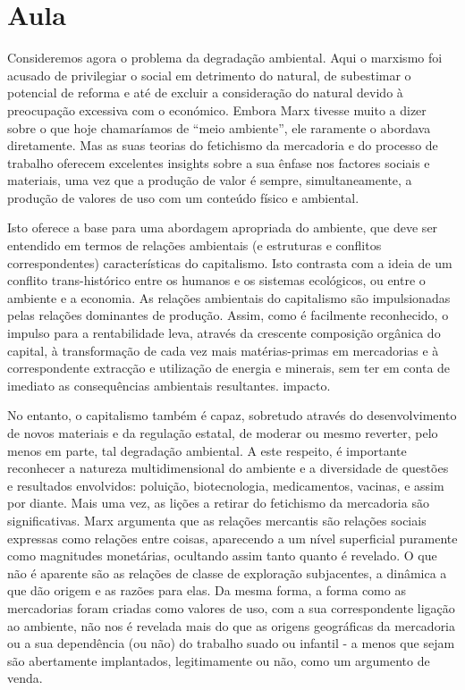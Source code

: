 \section{Aula}
 \par 
Consideremos agora o problema da degradação ambiental. Aqui o marxismo foi acusado de privilegiar o social em detrimento do natural, de subestimar o potencial de reforma e até de excluir a consideração do natural devido à preocupação excessiva com o económico. Embora Marx tivesse muito a dizer sobre o que hoje chamaríamos de “meio ambiente”, ele raramente o abordava diretamente. Mas as suas teorias do fetichismo da mercadoria e do processo de trabalho oferecem excelentes insights sobre a sua ênfase nos factores sociais e materiais, uma vez que a produção de valor é sempre, simultaneamente, a produção de valores de uso com um conteúdo físico e ambiental.
 \par 
Isto oferece a base para uma abordagem apropriada do ambiente, que deve ser entendido em termos de relações ambientais (e estruturas e conflitos correspondentes) características do capitalismo. Isto contrasta com a ideia de um conflito trans-histórico entre os humanos e os sistemas ecológicos, ou entre o ambiente e a economia. As relações ambientais do capitalismo são impulsionadas pelas relações dominantes de produção. Assim, como é facilmente reconhecido, o impulso para a rentabilidade leva, através da crescente composição orgânica do capital, à transformação de cada vez mais matérias-primas em mercadorias e à correspondente extracção e utilização de energia e minerais, sem ter em conta de imediato as consequências ambientais resultantes. impacto.
 \par 
No entanto, o capitalismo também é capaz, sobretudo através do desenvolvimento de novos materiais e da regulação estatal, de moderar ou mesmo reverter, pelo menos em parte, tal degradação ambiental. A este respeito, é importante reconhecer a natureza multidimensional do ambiente e a diversidade de questões e resultados envolvidos: poluição, biotecnologia, medicamentos, vacinas, e assim por diante. Mais uma vez, as lições a retirar do fetichismo da mercadoria são significativas. Marx argumenta que as relações mercantis são relações sociais expressas como relações entre coisas, aparecendo a um nível superficial puramente como magnitudes monetárias, ocultando assim tanto quanto é revelado. O que não é aparente são as relações de classe de exploração subjacentes, a dinâmica a que dão origem e as razões para elas. Da mesma forma, a forma como as mercadorias foram criadas como valores de uso, com a sua correspondente ligação ao ambiente, não nos é revelada mais do que as origens geográficas da mercadoria ou a sua dependência (ou não) do trabalho suado ou infantil - a menos que sejam são abertamente implantados, legitimamente ou não, como um argumento de venda.

